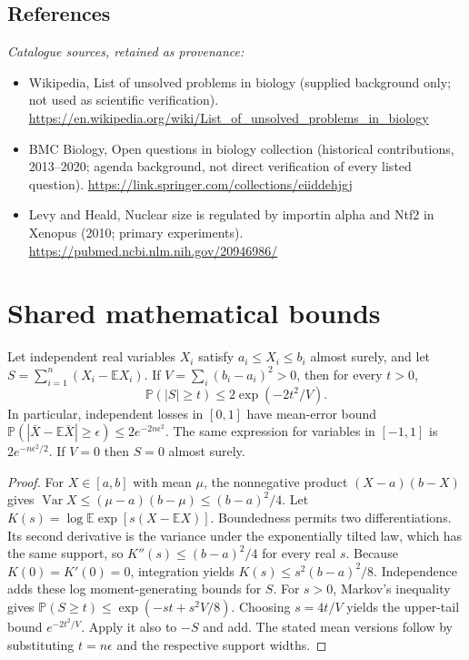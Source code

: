 \documentclass[11pt]{article}
\begin{document}
\subsection{References}
\noindent\emph{Catalogue sources, retained as provenance:}
\begin{itemize}
\item Wikipedia, List of unsolved problems in biology (supplied background only; not used as scientific verification). \url{https://en.wikipedia.org/wiki/List_of_unsolved_problems_in_biology}
\item BMC Biology, Open questions in biology collection (historical contributions, 2013--2020; agenda background, not direct verification of every listed question). \url{https://link.springer.com/collections/eiiddehjgj}
\item Levy and Heald, Nuclear size is regulated by importin alpha and Ntf2 in Xenopus (2010; primary experiments). \url{https://pubmed.ncbi.nlm.nih.gov/20946986/}
\end{itemize}




\section{Shared mathematical bounds}\label{app:bounds}
\begin{lemma}\label{lem:bounded}
Let independent real variables $X_i$ satisfy $a_i\leq X_i\leq b_i$ almost surely,
and let $S=\sum_{i=1}^n(X_i-\mathbb{E} X_i)$. If
$V=\sum_i(b_i-a_i)^2>0$, then for every $t>0$,
\[
 \mathbb{P}(|S|\geq t)\leq 2\exp(-2t^2/V).
\]
In particular, independent losses in $[0,1]$ have mean-error bound
$\mathbb{P}(|\overline X-\mathbb{E}\overline X|\geq\epsilon)
\leq2e^{-2n\epsilon^2}$. The same expression for variables in $[-1,1]$
is $2e^{-n\epsilon^2/2}$. If $V=0$ then $S=0$ almost surely.
\end{lemma}
\begin{proof}
For $X\in[a,b]$ with mean $\mu$, the nonnegative product
$(X-a)(b-X)$ gives
$\operatorname{Var} X\leq(\mu-a)(b-\mu)\leq(b-a)^2/4$.
Let $K(s)=\log\mathbb{E}\exp[s(X-\mathbb{E} X)]$.
Boundedness permits two differentiations. Its second derivative is the variance
under the exponentially tilted law, which has the same support, so
$K''(s)\leq(b-a)^2/4$ for every real $s$.
Because $K(0)=K'(0)=0$, integration yields
$K(s)\leq s^2(b-a)^2/8$.
Independence adds these log moment-generating bounds for $S$.
For $s>0$, Markov's inequality gives
$\mathbb{P}(S\geq t)\leq\exp(-st+s^2V/8)$.
Choosing $s=4t/V$ yields the upper-tail bound $e^{-2t^2/V}$.
Apply it also to $-S$ and add. The stated mean versions follow by substituting
$t=n\epsilon$ and the respective support widths.
\end{proof}
\end{document}

